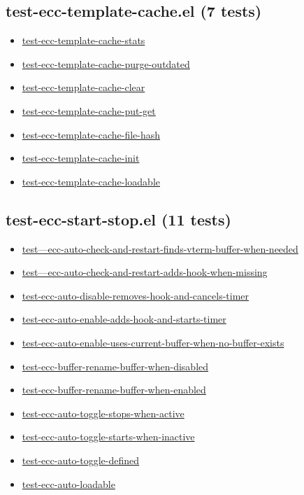 \documentclass[11pt]{article}
\begin{document}
\subsection{test-ecc-template-cache.el (7 tests)}
\label{sec:org5848a03}
\begin{itemize}
\item \href{test-ecc-template-cache.el}{test-ecc-template-cache-stats}
\item \href{test-ecc-template-cache.el}{test-ecc-template-cache-purge-outdated}
\item \href{test-ecc-template-cache.el}{test-ecc-template-cache-clear}
\item \href{test-ecc-template-cache.el}{test-ecc-template-cache-put-get}
\item \href{test-ecc-template-cache.el}{test-ecc-template-cache-file-hash}
\item \href{test-ecc-template-cache.el}{test-ecc-template-cache-init}
\item \href{test-ecc-template-cache.el}{test-ecc-template-cache-loadable}
\end{itemize}
\subsection{test-ecc-start-stop.el (11 tests)}
\label{sec:org4d63537}
\begin{itemize}
\item \href{test-ecc-start-stop.el}{test---ecc-auto-check-and-restart-finds-vterm-buffer-when-needed}
\item \href{test-ecc-start-stop.el}{test---ecc-auto-check-and-restart-adds-hook-when-missing}
\item \href{test-ecc-start-stop.el}{test-ecc-auto-disable-removes-hook-and-cancels-timer}
\item \href{test-ecc-start-stop.el}{test-ecc-auto-enable-adds-hook-and-starts-timer}
\item \href{test-ecc-start-stop.el}{test-ecc-auto-enable-uses-current-buffer-when-no-buffer-exists}
\item \href{test-ecc-start-stop.el}{test-ecc-buffer-rename-buffer-when-disabled}
\item \href{test-ecc-start-stop.el}{test-ecc-buffer-rename-buffer-when-enabled}
\item \href{test-ecc-start-stop.el}{test-ecc-auto-toggle-stops-when-active}
\item \href{test-ecc-start-stop.el}{test-ecc-auto-toggle-starts-when-inactive}
\item \href{test-ecc-start-stop.el}{test-ecc-auto-toggle-defined}
\item \href{test-ecc-start-stop.el}{test-ecc-auto-loadable}
\end{itemize}
\end{document}

